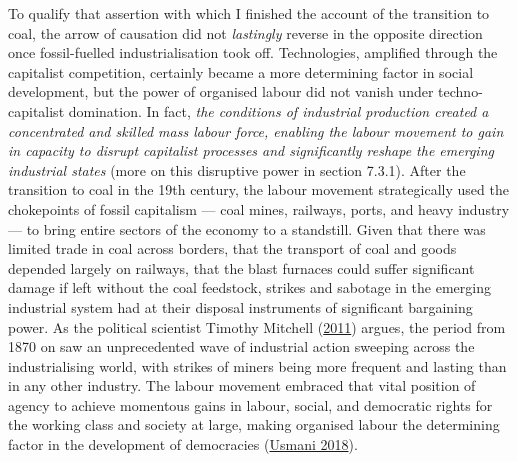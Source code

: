\documentclass[a4paper, nobind]{templates/ociamthesis}
\begin{document}
To qualify that assertion with which I finished the account of the transition to coal, the arrow of causation did not \emph{lastingly} reverse in the opposite direction once fossil-fuelled industrialisation took off. Technologies, amplified through the capitalist competition, certainly became a more determining factor in social development, but the power of organised labour did not vanish under techno-capitalist domination. In fact, \emph{the conditions of industrial production created a concentrated and skilled mass labour force, enabling the labour movement to gain in capacity to disrupt capitalist processes and significantly reshape the emerging industrial states} (more on this disruptive power in section 7.3.1). After the transition to coal in the 19th century, the labour movement strategically used the chokepoints of fossil capitalism --- coal mines, railways, ports, and heavy industry --- to bring entire sectors of the economy to a standstill. Given that there was limited trade in coal across borders, that the transport of coal and goods depended largely on railways, that the blast furnaces could suffer significant damage if left without the coal feedstock, strikes and sabotage in the emerging industrial system had at their disposal instruments of significant bargaining power. As the political scientist Timothy Mitchell (\protect\hyperlink{ref-mitchell_carbon_2011}{2011}) argues, the period from 1870 on saw an unprecedented wave of industrial action sweeping across the industrialising world, with strikes of miners being more frequent and lasting than in any other industry. The labour movement embraced that vital position of agency to achieve momentous gains in labour, social, and democratic rights for the working class and society at large, making organised labour the determining factor in the development of democracies (\protect\hyperlink{ref-usmani_democracy_2018}{Usmani 2018}).
\end{document}
